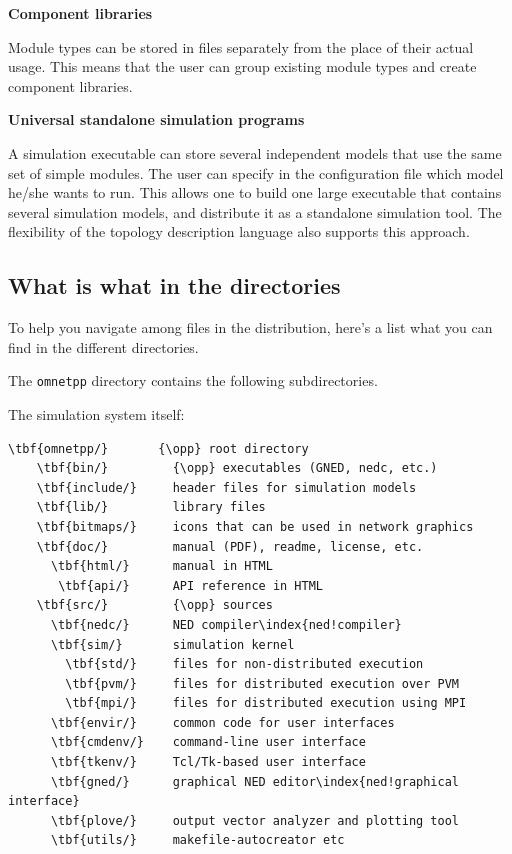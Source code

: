 \textbf{Component libraries}

Module types can be stored in files separately from the place
of their actual usage. This means that the user can group existing
module types and create component libraries.


\textbf{Universal standalone simulation programs}


A simulation executable can store several independent models
that use the same set of simple modules. The user can specify
in the configuration file which model he/she wants to run. This
allows one to build one large executable that contains several
simulation models, and distribute it as a standalone simulation
tool. The flexibility of the topology description language also
supports this approach.


\subsection{What is what in the directories}

To help you navigate among files in the {\opp} distribution,
here's a list what you can find in the different directories.

The \texttt{omnetpp} directory contains the following subdirectories.

The simulation system itself:

\begin{Verbatim}[commandchars=\\\{\}]
  \tbf{omnetpp/}       {\opp} root directory
    \tbf{bin/}         {\opp} executables (GNED, nedc, etc.)
    \tbf{include/}     header files for simulation models
    \tbf{lib/}         library files
    \tbf{bitmaps/}     icons that can be used in network graphics
    \tbf{doc/}         manual (PDF), readme, license, etc.
      \tbf{html/}      manual in HTML
       \tbf{api/}      API reference in HTML
    \tbf{src/}         {\opp} sources
      \tbf{nedc/}      NED compiler\index{ned!compiler}
      \tbf{sim/}       simulation kernel
        \tbf{std/}     files for non-distributed execution
        \tbf{pvm/}     files for distributed execution over PVM
        \tbf{mpi/}     files for distributed execution using MPI
      \tbf{envir/}     common code for user interfaces
      \tbf{cmdenv/}    command-line user interface
      \tbf{tkenv/}     Tcl/Tk-based user interface
      \tbf{gned/}      graphical NED editor\index{ned!graphical interface}
      \tbf{plove/}     output vector analyzer and plotting tool
      \tbf{utils/}     makefile-autocreator etc
\end{Verbatim}

